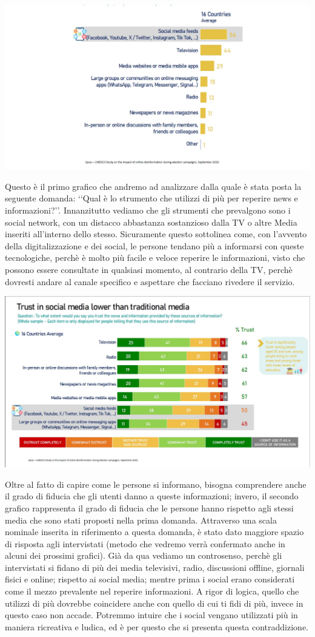 \documentclass{article}
\begin{document}
\centering\includegraphics[width=0.5\linewidth]{Immagini/Grafico1.jpg}\\
    \begin{justify}
    Questo è il primo grafico che andremo ad analizzare dalla quale è stata posta la seguente domanda: ‘‘Qual è lo strumento che utilizzi di più per reperire news e informazioni?’’.
    Innanzitutto vediamo che gli strumenti che prevalgono sono i social network, con un distacco abbastanza sostanzioso dalla TV o altre Media inseriti all'interno dello stesso. Sicuramente questo sottolinea come, con l'avvento della digitalizzazione e dei social, le persone tendano più a informarsi con queste tecnologiche, perchè è molto più facile e veloce reperire le informazioni, visto che possono essere consultate in qualsiasi momento, al contrario della TV, perchè dovresti andare al canale specifico e aspettare che facciano rivedere il servizio.
    
\begin{center}
\includegraphics[width=0.5\linewidth]{Immagini/Grafico2.jpg}\\
\end{center}
    Oltre al fatto di capire come le persone si informano, bisogna comprendere anche il grado di fiducia che gli utenti danno a queste informazioni; invero, il secondo grafico rappresenta il grado di fiducia che le persone hanno rispetto agli stessi media che sono stati proposti nella prima domanda.
    Attraverso una scala nominale inserita in riferimento a questa domanda, è stato dato maggiore spazio di risposta agli intervistati (metodo che vedremo verrà confermato anche in alcuni dei prossimi grafici).
    Già da qua vediamo un controsenso, perchè gli intervistati si fidano di più dei media televisivi, radio, discussioni offline, giornali fisici e online; rispetto ai social media; mentre prima i social erano considerati come il mezzo prevalente nel reperire informazioni. A rigor di logica, quello che utilizzi di più dovrebbe coincidere anche con quello di cui ti fidi di più, invece in questo caso non accade. Potremmo intuire che i social vengano utilizzati più in maniera ricreativa e ludica, ed è per questo che si presenta questa contraddizione.
    

\end{justify}
\end{document}

